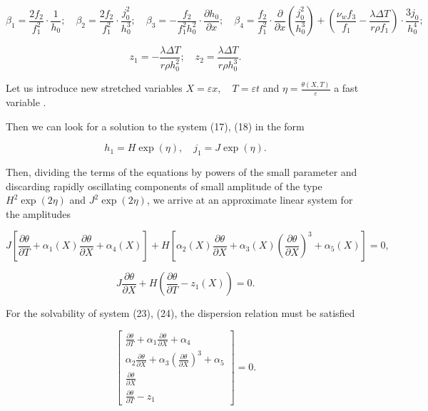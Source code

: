 \begin{equation}
\beta_1 = \frac{2 f_2}{f_1^2} \cdot \frac{1}{h_0};\quad
\beta_2 = \frac{2 f_2}{f_1^2} \cdot \frac{j_0^2}{h_0^3};\quad
\beta_3 = - \frac{f_2}{f_1^2 h_0^2} \cdot \frac{\partial h_0}{\partial x};\quad
\beta_4 = \frac{f_2}{f_1^2} \cdot \frac{\partial}{\partial x} \left( \frac{j_0^2}{h_0^3} \right)
+ \left( \frac{\nu_w f_3}{f_1} - \frac{\lambda \Delta T}{r \rho f_1} \right) \cdot \frac{3 j_0}{h_0^4};\quad
\end{equation}

\begin{equation}
z_1 = - \frac{\lambda \Delta T}{r \rho h_0^2};\quad
z_2 = \frac{\lambda \Delta T}{r \rho h_0^3}.
\end{equation}

Let us introduce new stretched variables $X=\varepsilon x,\quad T=\varepsilon t$
and $\eta=\frac{\theta(X,T)}{\varepsilon}$
a fast variable
.

Then we can look for a solution to the system (17), (18) in the form

\begin{equation}
h_1 = H \exp(\eta), \quad j_1 = J \exp(\eta).
\end{equation}

Then, dividing the terms of the equations by powers of the small
parameter and discarding rapidly oscillating components of small
amplitude of the type $H^2\exp(2\eta)$ and $J^2\exp(2\eta)$, we arrive
at an approximate linear system for the amplitudes

\begin{equation}
J \left[ \frac{\partial \theta}{\partial T} + \alpha_1(X) \frac{\partial \theta}{\partial X} + \alpha_4(X) \right]
+ H \left[ \alpha_2(X) \frac{\partial \theta}{\partial X} + \alpha_3(X) \left( \frac{\partial \theta}{\partial X} \right)^3 + \alpha_5(X) \right] = 0,
\end{equation}

\begin{equation}
J \frac{\partial \theta}{\partial X} + H \left( \frac{\partial \theta}{\partial T} - z_1(X) \right) = 0.
\end{equation}

For the solvability of system (23), (24), the dispersion relation must
be satisfied

\begin{equation}
\left[
\begin{matrix}
\frac{\partial \theta}{\partial T} + \alpha_1 \frac{\partial \theta}{\partial X} + \alpha_4 \\
\alpha_2 \frac{\partial \theta}{\partial X} + \alpha_3 \left( \frac{\partial \theta}{\partial X} \right)^3 + \alpha_5 \\
\frac{\partial \theta}{\partial X} \\
\frac{\partial \theta}{\partial T} - z_1
\end{matrix}
\right]
= 0.
\end{equation}

